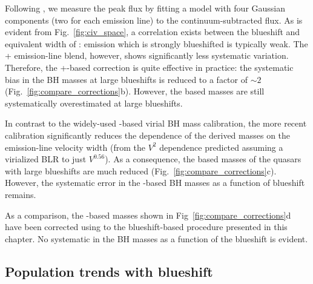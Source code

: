 Following \citet{runnoe13}, we measure the peak flux by fitting a model with four Gaussian components (two for each emission line) to the continuum-subtracted flux.
As is evident from Fig.~\ref{fig:civ_space}, a correlation exists between the blueshift and equivalent width of :  emission which is strongly blueshifted is typically weak. 
The + emission-line blend, however, shows significantly less systematic variation. 
Therefore, the +-based correction is quite effective in practice: the systematic bias in the  BH masses at large  blueshifts is reduced to a factor of $\sim2$ (Fig.~\ref{fig:compare_corrections}b).
However, the  based masses are still systematically overestimated at large  blueshifts. 

In contrast to the widely-used \citet{vestergaard06} -based virial BH mass calibration, the more recent \citet{park13} calibration significantly reduces the dependence of the derived masses on the emission-line velocity width (from the $V^2$ dependence predicted assuming a virialized BLR to just $V^{0.56}$).
As a consequence, the  based masses of the quasars with large  blueshifts are much reduced (Fig.~\ref{fig:compare_corrections}c).
However, the systematic error in the -based BH masses as a function of  blueshift remains. 

As a comparison, the -based masses shown in Fig~\ref{fig:compare_corrections}d have been corrected using to the  blueshift-based procedure presented in this chapter. 
No systematic in the BH masses as a function of the  blueshift is evident. 

\subsection{Population trends with  blueshift}
\label{sec:hatrends}

